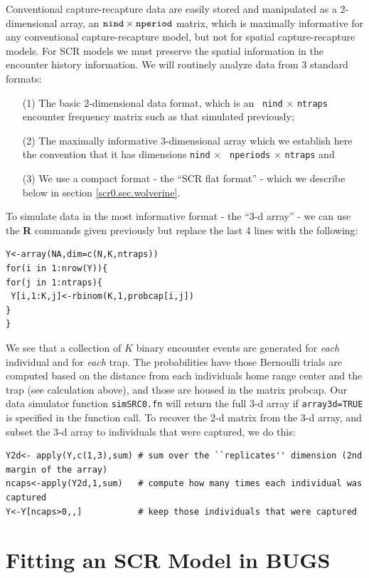 Conventional capture-recapture data are easily stored and manipulated
as a 2-dimensional array, an $\mbox{\tt nind} \times \mbox{\tt
  nperiod}$ matrix, which is maximally informative for any
conventional capture-recapture model, but not for spatial
capture-recapture models.  For SCR models we must preserve the spatial
information in the encounter history information. We will routinely
analyze data from 3 standard formats:
\begin{itemize}
\item[(1)] The basic 2-dimensional data format, which is an \mbox{\tt
    nind} $\times$ \mbox{\tt ntraps} encounter frequency matrix such as that simulated previously; 
\item[(2)] The maximally informative 3-dimensional array which we
  establish here the 
convention that it has dimensions \mbox{\tt nind} $\times$ \mbox{\tt
  nperiods} $\times$ \mbox{\tt ntraps} and 
\item[(3)] We use a compact format - the ``SCR flat format'' - which
  we describe below  in section \ref{scr0.sec.wolverine}.
\end{itemize}
To simulate data in the most informative format - the ``3-d array'' -
we can use the {\bf R} commands given previously but replace the last 4 lines with the following: 
\begin{verbatim}
Y<-array(NA,dim=c(N,K,ntraps))
for(i in 1:nrow(Y)){
for(j in 1:ntraps){
 Y[i,1:K,j]<-rbinom(K,1,probcap[i,j])
}
}
\end{verbatim}
We see that a collection of $K$ binary encounter events are generated
for {\it each} individual and for {\it each} trap.  The probabilities
have those Bernoulli trials are computed based on the distance from
each individuals home range center and the trap (see calculation
above), and those are housed in the matrix probcap. Our data simulator
function \mbox{\tt simSRC0.fn} will return the full 3-d array if
\mbox{\tt array3d=TRUE} is specified in the function call.  To recover
the 2-d matrix from the 3-d array, and subset the 3-d array to
individuals that were captured, we do this:
{\small
\begin{verbatim}
Y2d<- apply(Y,c(1,3),sum) # sum over the ``replicates'' dimension (2nd margin of the array)
ncaps<-apply(Y2d,1,sum)   # compute how many times each individual was captured
Y<-Y[ncaps>0,,]           # keep those individuals that were captured
\end{verbatim}
}


\section{Fitting an SCR Model in BUGS}
\label{scr0.sec.winbugs1}

